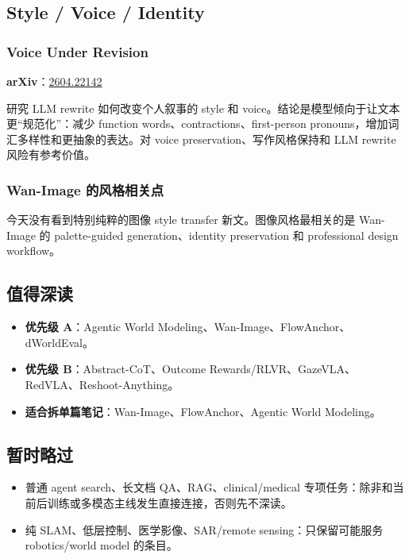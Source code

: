 \subsection{Style / Voice / Identity}

\subsubsection{Voice Under Revision}

\textbf{arXiv}：\href{https://arxiv.org/abs/2604.22142}{2604.22142}

研究 LLM rewrite 如何改变个人叙事的 style 和 voice。结论是模型倾向于让文本更“规范化”：减少 function words、contractions、first-person pronouns，增加词汇多样性和更抽象的表达。对 voice preservation、写作风格保持和 LLM rewrite 风险有参考价值。

\subsubsection{Wan-Image 的风格相关点}

今天没有看到特别纯粹的图像 style transfer 新文。图像风格最相关的是 Wan-Image 的 palette-guided generation、identity preservation 和 professional design workflow。

\subsection{值得深读}

\begin{itemize}[leftmargin=1.5em]
  \item \textbf{优先级 A}：Agentic World Modeling、Wan-Image、FlowAnchor、dWorldEval。
  \item \textbf{优先级 B}：Abstract-CoT、Outcome Rewards/RLVR、GazeVLA、RedVLA、Reshoot-Anything。
  \item \textbf{适合拆单篇笔记}：Wan-Image、FlowAnchor、Agentic World Modeling。
\end{itemize}

\subsection{暂时略过}

\begin{itemize}[leftmargin=1.5em]
  \item 普通 agent search、长文档 QA、RAG、clinical/medical 专项任务：除非和当前后训练或多模态主线发生直接连接，否则先不深读。
  \item 纯 SLAM、低层控制、医学影像、SAR/remote sensing：只保留可能服务 robotics/world model 的条目。
\end{itemize}

